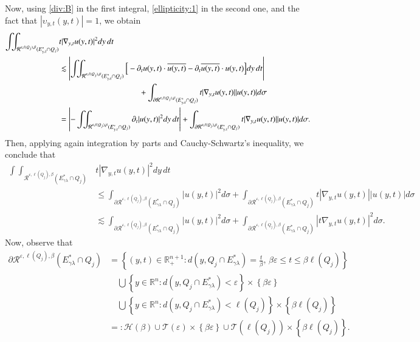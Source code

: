 \documentclass[11pt, a4paper,leqno]{amsart}
\theoremstyle{plain}
\theoremstyle{definition}
\theoremstyle{remark}
\numberwithin{equation}{section}
\def \R{ \mathbb{R} }
\def \iint{\int\!\!\!\int}
\begin{document}
Now, using \eqref{div:B} in the first integral, \eqref{ellipticity:1} 
in the second one, and the fact that $|\upsilon_{y,t}(y,t)|=1$, we obtain
\begin{align*}
\iint_{\mathcal{R}^{\varepsilon,\ell(Q_j),\beta}(E^*_{\gamma\lambda}\cap Q_j)}&t|\nabla_{y,t}u(y,t)|^2 dy\,dt
\\&
\lesssim \left|
 \iint_{\mathcal{R}^{\varepsilon,\ell(Q_j),\beta}(E^*_{\gamma\lambda}\cap Q_j)}\Big[-\partial_tu(y,t)\cdot \overline{u(y,t)}- \partial_t\overline{u(y,t)}\cdot u(y,t)\Big] dy\,dt\right|
\\
&\hspace*{3.5cm}+ \int_{\partial \mathcal{R}^{\varepsilon,\ell(Q_j),\beta}(E^*_{\gamma\lambda}\cap Q_j)}t|\nabla_{y,t}u(y,t)||u(y,t)| d\sigma
\\
&=
 \left|-\iint_{\mathcal{R}^{\varepsilon,\ell(Q_j),\beta}(E^*_{\gamma\lambda}\cap Q_j)}\partial_t|u(y,t)|^2 dy\,dt\right|
+ \int_{\partial \mathcal{R}^{\varepsilon,\ell(Q_j),\beta}(E^*_{\gamma\lambda}\cap Q_j)}t|\nabla_{y,t}u(y,t)||u(y,t)| d\sigma.
\end{align*}
Then, applying again integration by parts and Cauchy-Schwartz's inequality, we conclude that
\begin{align}\label{integrationbypart}
\iint_{\mathcal{R}^{\varepsilon,\ell(Q_j),\beta}(E^*_{\gamma\lambda}\cap Q_j)}&t|\nabla_{y,t}u(y,t)|^2 dy\,dt
\\&\nonumber
\leq
 \int_{\partial \mathcal{R}^{\varepsilon,\ell(Q_j),\beta}(E^*_{\gamma\lambda}\cap Q_j)}|u(y,t)|^2d\sigma
+ \int_{\partial \mathcal{R}^{\varepsilon,\ell(Q_j),\beta}(E^*_{\gamma\lambda}\cap Q_j)}t|\nabla_{y,t}u(y,t)||u(y,t)| d\sigma
\\&\nonumber
\lesssim
\int_{\partial \mathcal{R}^{\varepsilon,\ell(Q_j),\beta}(E^*_{\gamma\lambda}\cap Q_j)}|u(y,t)|^2d\sigma
+ \int_{\partial \mathcal{R}^{\varepsilon,\ell(Q_j),\beta}(E^*_{\gamma\lambda}\cap Q_j)}|t\nabla_{y,t}u(y,t)|^2 d\sigma.
\end{align}
Now, observe that
\begin{align*}
\partial \mathcal{R}^{\varepsilon,\ell(Q_j),\beta}(E^*_{\gamma\lambda}\cap Q_j)&=\left\{(y,t)\in \R^{n+1}_+:d(y,Q_j\cap E^{*}_{\gamma\lambda})=\frac{t}{\beta},\, \beta\varepsilon\leq t\leq \beta\ell(Q_j)\right\}
\\&\quad
\bigcup \left\{y\in \R^{n}:d(y,Q_j\cap E^{*}_{\gamma\lambda})<\varepsilon\right\}\times \left\{\beta\varepsilon\right\}
\\&\quad
\bigcup \left\{y\in \R^{n}:d(y,Q_j\cap E^{*}_{\gamma\lambda})<\ell(Q_j)\right\}\times \left\{\beta\ell(Q_j)\right\}
\\&
=:\mathcal{H}(\beta)\cup\mathcal{T}(\varepsilon)\times \left\{\beta\varepsilon\right\}\cup\mathcal{T}(\ell(Q_j))\times \left\{\beta\ell(Q_j)\right\}.
\end{align*}
\end{document}
